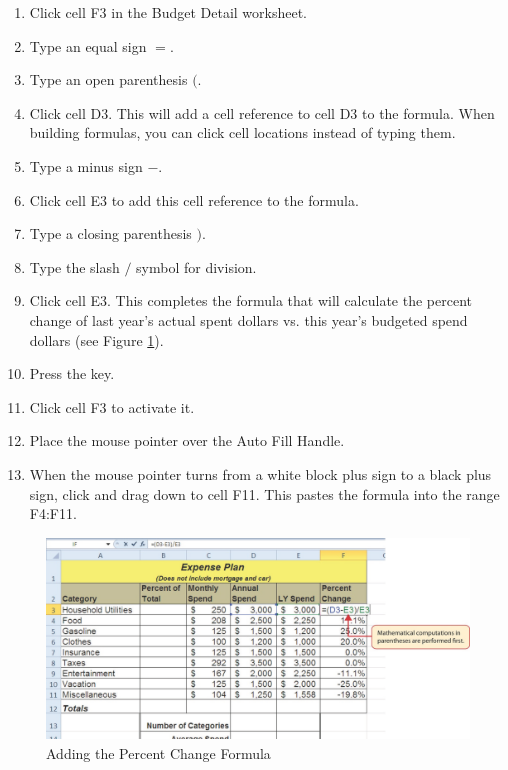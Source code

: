 \begin{enumerate}
	\item Click cell \textsf{F3} in the Budget Detail worksheet.
	\item Type an equal sign $ = $.
	\item Type an open parenthesis $ ( $.
	\item Click cell \textsf{D3}. This will add a cell reference to cell \textsf{D3} to the formula. When building formulas, you can click cell locations instead of typing them.
	\item Type a minus sign $ - $.
	\item Click cell \textsf{E3} to add this cell reference to the formula.
	\item Type a closing parenthesis $ ) $.
	\item Type the slash $ / $ symbol for division.
	\item Click cell \textsf{E3}. This completes the formula that will calculate the percent change of last year's actual spent dollars vs. this year's budgeted spend dollars (see Figure \ref{02:fig06}).
	\item Press the  key.
	\item Click cell \textsf{F3} to activate it.
	\item Place the mouse pointer over the Auto Fill Handle.
	\item When the mouse pointer turns from a white block plus sign to a black plus sign, click and drag down to cell \textsf{F11}. This pastes the formula into the range \textsf{F4:F11}.
\end{enumerate}

\begin{figure}[H]
	\centering
	\includegraphics[width=\maxwidth{.95\linewidth}]{gfx/ch02_fig06}
	\caption{Adding the Percent Change Formula}
	\label{02:fig06}
\end{figure}

